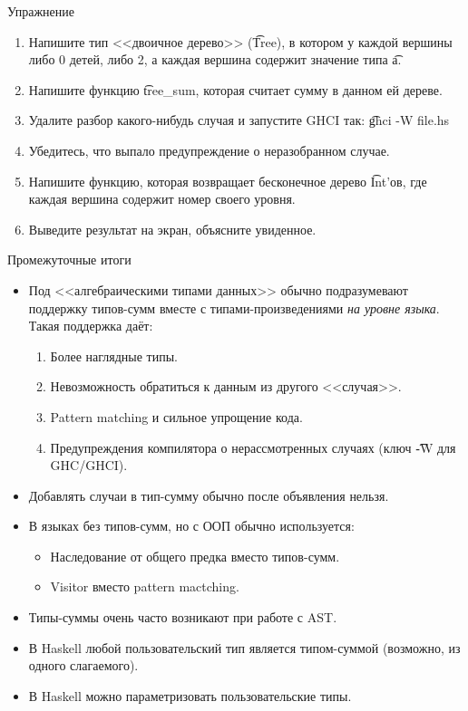 \begin{frame}[fragile]{Упражнение}
	\begin{enumerate}
		\item Напишите тип <<двоичное дерево>> (\t{Tree}), в котором у каждой вершины либо 0 детей, либо 2, а каждая вершина содержит значение типа \t{a}.
		\item Напишите функцию \t{tree\_sum}, которая считает сумму в данном ей дереве.
		\item Удалите разбор какого-нибудь случая и запустите GHCI так: \t{ghci -W file.hs}
		\item Убедитесь, что выпало предупреждение о неразобранном случае.
		\item Напишите функцию, которая возвращает бесконечное дерево \t{Int}'ов, где каждая вершина содержит номер своего уровня.
		\item Выведите результат на экран, объясните увиденное.
	\end{enumerate}
\end{frame}

\begin{frame}{Промежуточные итоги}
	\begin{itemize}
		\item
			Под <<алгебраическими типами данных>> обычно подразумевают поддержку типов-сумм вместе с типами-произведениями \textit{на уровне языка}.
			Такая поддержка даёт:
			\begin{enumerate}
				\item Более наглядные типы.
				\item Невозможность обратиться к данным из другого <<случая>>.
				\item Pattern matching и сильное упрощение кода.
				\item Предупреждения компилятора о нерассмотренных случаях (ключ \t{-W} для GHC/GHCI).
			\end{enumerate}
		\item Добавлять случаи в тип-сумму обычно после объявления нельзя.
		\item В языках без типов-сумм, но с ООП обычно используется:
			\begin{itemize}
				\item Наследование от общего предка вместо типов-сумм.
				\item Visitor вместо pattern mactching.
			\end{itemize}
		\item Типы-суммы очень часто возникают при работе с AST.
		\item В Haskell любой пользовательский тип является типом-суммой (возможно, из одного слагаемого).
		\item В Haskell можно параметризовать пользовательские типы.
	\end{itemize}
\end{frame}

